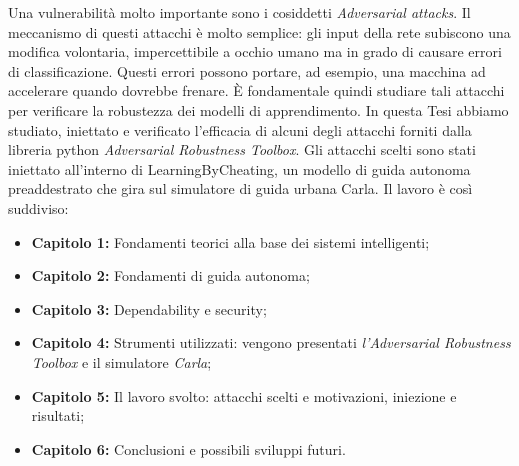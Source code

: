Una vulnerabilità molto importante sono i cosiddetti \emph{Adversarial attacks}. Il meccanismo di questi attacchi è molto semplice:
gli input della rete  subiscono una modifica volontaria, impercettibile a occhio umano ma in grado di causare errori di  classificazione.  Questi errori possono portare, ad esempio, una macchina ad accelerare quando
dovrebbe frenare. È fondamentale quindi studiare tali attacchi per verificare la robustezza dei modelli di apprendimento.
In questa Tesi abbiamo studiato, iniettato e verificato l'efficacia di  alcuni degli attacchi forniti dalla libreria python \emph{Adversarial Robustness Toolbox}. Gli attacchi scelti sono stati iniettato all'interno
di LearningByCheating, un modello di guida autonoma preaddestrato che gira sul simulatore di guida urbana Carla.
Il lavoro è così suddiviso:
\begin{itemize}
  \item \textbf{Capitolo 1:} Fondamenti teorici alla base dei sistemi intelligenti;
  \item \textbf{Capitolo 2:} Fondamenti di guida autonoma;
  \item \textbf{Capitolo 3:} Dependability e security;
  \item \textbf{Capitolo 4:} Strumenti utilizzati: vengono presentati \emph{l'Adversarial Robustness Toolbox} e il simulatore \emph{Carla};
  \item \textbf{Capitolo 5:} Il lavoro svolto: attacchi scelti e motivazioni, iniezione e risultati;
  \item \textbf{Capitolo 6:} Conclusioni e possibili sviluppi futuri.
  
\end{itemize}


